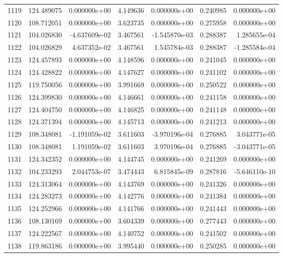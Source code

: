 \begin{tabular}{rrrrrrr}
1119 & 124.489075 &  0.000000e+00 &  4.149636 &  0.000000e+00 &    0.240985 &  0.000000e+00 \\
1120 & 108.712051 &  0.000000e+00 &  3.623735 &  0.000000e+00 &    0.275958 &  0.000000e+00 \\
1121 & 104.026830 & -4.637609e-02 &  3.467561 & -1.545870e-03 &    0.288387 &  1.285655e-04 \\
1122 & 104.026829 &  4.637352e-02 &  3.467561 &  1.545784e-03 &    0.288387 & -1.285584e-04 \\
1123 & 124.457893 &  0.000000e+00 &  4.148596 &  0.000000e+00 &    0.241045 &  0.000000e+00 \\
1124 & 124.428822 &  0.000000e+00 &  4.147627 &  0.000000e+00 &    0.241102 &  0.000000e+00 \\
1125 & 119.750056 &  0.000000e+00 &  3.991669 &  0.000000e+00 &    0.250522 &  0.000000e+00 \\
1126 & 124.399830 &  0.000000e+00 &  4.146661 &  0.000000e+00 &    0.241158 &  0.000000e+00 \\
1127 & 124.404750 &  0.000000e+00 &  4.146825 &  0.000000e+00 &    0.241148 &  0.000000e+00 \\
1128 & 124.371394 &  0.000000e+00 &  4.145713 &  0.000000e+00 &    0.241213 &  0.000000e+00 \\
1129 & 108.348081 & -1.191059e-02 &  3.611603 & -3.970196e-04 &    0.276885 &  3.043771e-05 \\
1130 & 108.348081 &  1.191059e-02 &  3.611603 &  3.970196e-04 &    0.276885 & -3.043771e-05 \\
1131 & 124.342352 &  0.000000e+00 &  4.144745 &  0.000000e+00 &    0.241269 &  0.000000e+00 \\
1132 & 104.233293 &  2.044753e-07 &  3.474443 &  6.815845e-09 &    0.287816 & -5.646110e-10 \\
1133 & 124.313064 &  0.000000e+00 &  4.143769 &  0.000000e+00 &    0.241326 &  0.000000e+00 \\
1134 & 124.283273 &  0.000000e+00 &  4.142776 &  0.000000e+00 &    0.241384 &  0.000000e+00 \\
1135 & 124.252966 &  0.000000e+00 &  4.141766 &  0.000000e+00 &    0.241443 &  0.000000e+00 \\
1136 & 108.130169 &  0.000000e+00 &  3.604339 &  0.000000e+00 &    0.277443 &  0.000000e+00 \\
1137 & 124.222567 &  0.000000e+00 &  4.140752 &  0.000000e+00 &    0.241502 &  0.000000e+00 \\
1138 & 119.863186 &  0.000000e+00 &  3.995440 &  0.000000e+00 &    0.250285 &  0.000000e+00 \\

\end{tabular}
